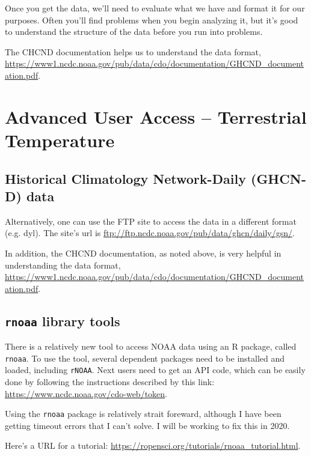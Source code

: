 \documentclass{article}\usepackage[]{graphicx}\usepackage[]{xcolor}
\begin{document}
Once you get the data, we'll need to evaluate what we have and format it for our purposes. Often you'll find problems when you begin analyzing it, but it's good to understand the structure of the data before you run into problems. 

The CHCND documentation helps us to understand the data format, \url{https://www1.ncdc.noaa.gov/pub/data/cdo/documentation/GHCND_documentation.pdf}.



\section{Advanced User Access -- Terrestrial Temperature}  

\subsection{Historical Climatology Network-Daily (GHCN‐D) data}

Alternatively, one can use the FTP site to access the data in a different format (e.g. dyl). The site's url is \url{ftp://ftp.ncdc.noaa.gov/pub/data/ghcn/daily/gsn/}. 

In addition, the CHCND documentation, as noted above, is very helpful in understanding the data format, \url{https://www1.ncdc.noaa.gov/pub/data/cdo/documentation/GHCND_documentation.pdf}.

\subsection{\texttt{rnoaa} library tools}

There is a relatively new tool to access NOAA data using an R package, called \texttt{rnoaa}. To use the tool, several dependent packages need to be installed and loaded, including \texttt{rNOAA}. Next users need to get an API code, which can be easily done by following the instructions described by this link: \url{https://www.ncdc.noaa.gov/cdo-web/token}.

Using the \texttt{rnoaa} package is relatively strait foreward, although I have been getting timeout errors that I can't solve. I will be working to fix this in 2020. 

Here's a URL for a tutorial: \url{https://ropensci.org/tutorials/rnoaa_tutorial.html}.
\end{document}
